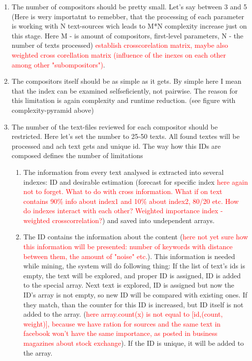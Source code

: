 \documentclass[11pt]{article}
\begin{document}
\begin{enumerate}
	\item The number of compositors should be pretty small. Let's say between 3 and 5 (Here is wery importatnt to remebber, that the processing of each parameter is working with N text-sources wich leads to M*N complexity increase just on this stage. Here M - is amount of compositors, first-level parameters, N - the number of texts processed) \textcolor{red}{establish crosscorelation matrix, maybe also weighted cross corellation matrix (influence of the inexes on each other among other "subompositors")}.\\
	\item The compositors itself should be as simple as it gets. By simple here I mean that the index can be examined selfseficiently, not pairwise. The reason for this limitation is again complexity and runtime reduction. (see figure with complexity-pyramid above)\\
	\item The number of the text-files reviewed for each compositor should be restricted. Here let's set the number to 25-50 texts. All found textes will be processed and ach text gets and unique id. The way how this IDs are composed defines the number of limitations\\
		\begin{enumerate}
		\item The information from every text analysed is extracted into several indexes: ID and desirable estimation (forecast for specific index \textcolor{red}{here again not to forget. What to do with cross information. What if on text contains 90\% info about index1 and 10\% about index2, 80/20 etc. How do indexes interact with each other? Weighted importance index - weighted crosscorrelation?}) and saved into undependent arrays.
		\item The ID contains the information about the content (\textcolor{red}{here not yet sure how this information will be presented: number of keywords with distance between them, the amount of "noise" etc.}). This information is needed while mining, the system will do following thing: If the list of text's ids is empty, the text will be explored, and proper ID is assigned, ID is added to the special array. Next text is explored, ID is assigned but now the ID's array is not empty, so new ID will be compared with existing ones. If they match, than the counter for this ID is increased, but ID itself is not added to the array. (\textcolor{red}{here array.count(x) is not equal to [id,(count, weight)], because we have ration for sources and the same text in facebook won't have the same importance, as posted in business magazines about stock exchange}). If the ID is unique, it will be added to the array.

\end{enumerate}
\end{enumerate}
\end{document}
